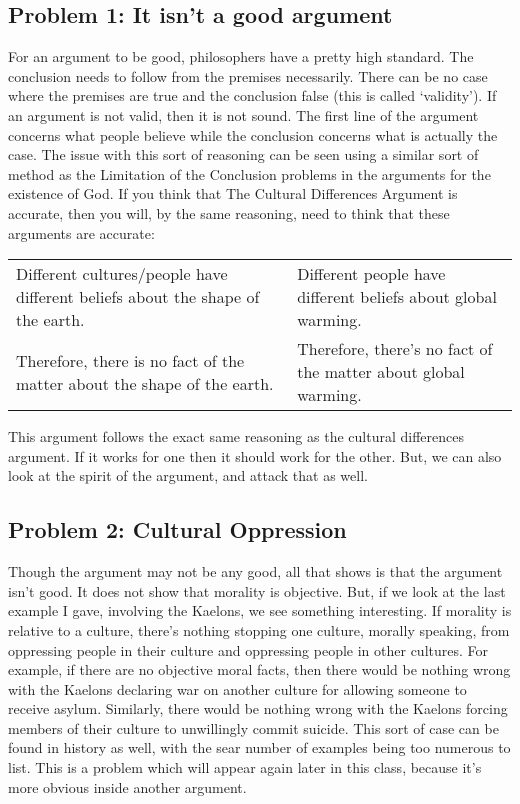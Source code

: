\subsection{Problem 1: It isn't a good argument}

For an argument to be good, philosophers have a pretty high standard. The conclusion needs to follow from the premises necessarily. There can be no case where the premises are true and the conclusion false (this is called ‘validity’). If an argument is not valid, then it is not sound. The first line of the argument concerns what people believe while the conclusion concerns what is actually the case. The issue with this sort of reasoning can be seen using a similar sort of method as the Limitation of the Conclusion problems in the arguments for the existence of God. If you think that The Cultural Differences Argument is accurate, then you will, by the same reasoning, need to think that these arguments are accurate: 

\begin{tabular}{p{2in}|p{2in}}
    Different cultures/people have different beliefs about the shape of the earth.& Different people have different beliefs about global warming.\\
    Therefore, there is no fact of the matter about the shape of the earth.&Therefore, there's no fact of the matter about global warming.\\
\end{tabular}

This argument follows the exact same reasoning as the cultural differences argument. If it works for one then it should work for the other. But, we can also look at the spirit of the argument, and attack that as well. 

\subsection{Problem 2: Cultural Oppression}

Though the argument may not be any good, all that shows is that the argument isn't good. It does not show that morality is objective. But, if we look at the last example I gave, involving the Kaelons, we see something interesting. If morality is relative to a culture, there's nothing stopping one culture, morally speaking, from oppressing people in their culture and oppressing people in other cultures. For example, if there are no objective moral facts, then there would be nothing wrong with the Kaelons declaring war on another culture for allowing someone to receive asylum. Similarly, there would be nothing wrong with the Kaelons forcing members of their culture to unwillingly commit suicide. This sort of case can be found in history as well, with the sear number of examples being too numerous to list. This is a problem which will appear again later in this class, because it's more obvious inside another argument.  

